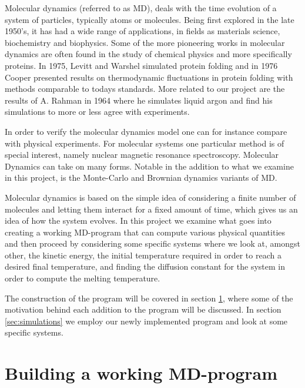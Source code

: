 \documentclass[a4paper]{article}
\begin{document}
    Molecular dynamics (referred to as MD), deals with the time evolution of a
    system of particles, typically atoms or molecules. Being first explored in
    the late 1950's, it has had a wide range of applications, in fields as
    materials science, biochemistry and biophysics. Some of the more pioneering
    works in molecular dynamics are often found in the study of chemical
    physics and more specifically proteins.  In 1975, Levitt and Warshel
    \cite{folding} simulated protein folding and in 1976 Cooper
    \cite{thermoprotein} presented results on thermodynamic fluctuations in
    protein folding with methods comparable to todays standards. More related
    to our project are the results of A. Rahman in 1964 \cite{liquid_argon}
    where he simulates liquid argon and find his simulations to more or less
    agree with experiments. 
    
    In order to verify the molecular dynamics model one can for instance
    compare with physical experiments. For molecular systems one particular
    method is of special interest, namely nuclear magnetic resonance
    spectroscopy.  Molecular Dynamics can take on many forms. Notable in the
    addition to what we examine in this project, is the Monte-Carlo and
    Brownian dynamics variants of MD. 
     
    Molecular dynamics is based on the simple idea of considering a finite
    number of molecules and letting them interact for a fixed amount of time,
    which gives us an idea of how the system evolves.  In this project we
    examine what goes into creating a working MD-program that can compute
    various physical quantities and then proceed by considering some specific
    systems where we look at, amongst other, the kinetic energy, the initial
    temperature required in order to reach a desired final temperature, and
    finding the diffusion constant for the system in order to compute the
    melting temperature.

    The construction of the program will be covered in section
    \ref{sec:building_a_working_md_program}, where some of the motivation
    behind each addition to the program will be discussed. In section
    \ref{sec:simulations} we employ our newly implemented program and look at
    some specific systems.
    
\section{Building a working MD-program}
\label{sec:building_a_working_md_program}
    
\end{document}
